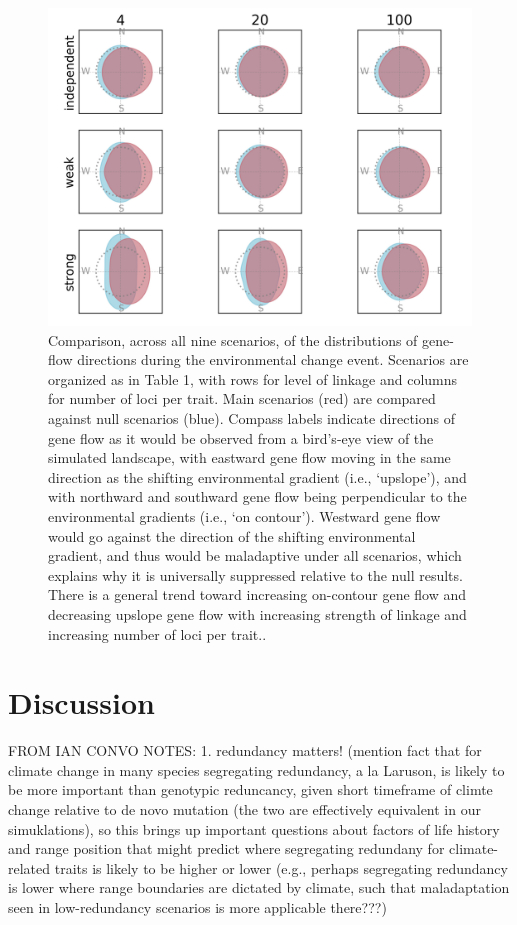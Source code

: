 \documentclass[9pt,twocolumn,twoside,lineno]{pnas-new}
\begin{document}
\begin{figure}
\centering
\includegraphics[width=17.8cm]{gene_flow.jpg}
\caption{Comparison, across all nine scenarios, of the distributions of gene-flow directions during the environmental change event. Scenarios are organized as in Table 1, with rows for level of linkage and columns for number of loci per trait. Main scenarios (red) are compared against null scenarios (blue). Compass labels indicate directions of gene flow as it would be observed from a bird’s-eye view of the simulated landscape, with eastward gene flow moving in the same direction as the shifting environmental gradient (i.e., ‘upslope’), and with northward and southward gene flow being perpendicular to the environmental gradients (i.e., ‘on contour’). Westward gene flow would go against the direction of the shifting environmental gradient, and thus would be maladaptive under all scenarios, which explains why it is universally suppressed relative to the null results. There is a general trend toward increasing on-contour gene flow and decreasing upslope gene flow with increasing strength of linkage and increasing number of loci per trait..
}
\label{fig:gene_flow}
\end{figure}


\section*{Discussion}

FROM IAN CONVO NOTES:
 1. redundancy matters! (mention fact that for climate change in many species segregating redundancy, a la Laruson, is likely to be more important than genotypic reduncancy, given short timeframe of climte change relative to de novo mutation (the two are effectively equivalent in our simuklations), so this brings up important questions about factors of life history and range position that might predict where segregating redundany for climate-related traits is likely to be higher or lower (e.g., perhaps segregating redundancy is lower where range boundaries are dictated by climate, such that maladaptation seen in low-redundancy scenarios is more applicable there???)
\end{document}
